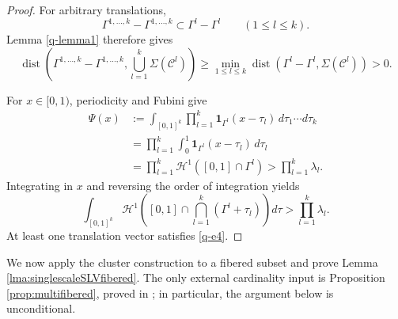 \documentclass[12pt]{amsart}
\numberwithin{equation}{section}
\begin{document}
\begin{proof}
For arbitrary translations,
\[
 \Gamma^{1,\dots,k}-\Gamma^{1,\dots,k}
 \subset\Gamma^l-\Gamma^l
 \qquad(1\leq l\leq k).
\]
Lemma \ref{q-lemma1} therefore gives
\[
 \operatorname{dist}\left(
 \Gamma^{1,\dots,k}-\Gamma^{1,\dots,k},
 \bigcup_{l=1}^k\Sigma(\mathcal C^l)\right)
 \geq\min_{1\leq l\leq k}
 \operatorname{dist}(\Gamma^l-\Gamma^l,\Sigma(\mathcal C^l))>0.
\]

For $x\in[0,1)$, periodicity and Fubini give
\begin{align*}
 \Psi(x)
 &:=\int_{[0,1]^k}\prod_{l=1}^k
 \mathbf1_{\Gamma^l}(x-\tau_l)\,d\tau_1\cdots d\tau_k\\
 &=\prod_{l=1}^k\int_0^1
 \mathbf1_{\Gamma^l}(x-\tau_l)\,d\tau_l\\
 &=\prod_{l=1}^k\mathcal H^1([0,1]\cap\Gamma^l)
 >\prod_{l=1}^k\lambda_l.
\end{align*}
Integrating in $x$ and reversing the order of integration yields
\[
 \int_{[0,1]^k}
 \mathcal H^1\left([0,1]\cap\bigcap_{l=1}^k
 (\Gamma^l+\tau_l)\right)d\tau
 >\prod_{l=1}^k\lambda_l.
\]
At least one translation vector satisfies \eqref{q-e4}.
\end{proof}



We now apply the cluster construction to a fibered subset and prove Lemma \ref{lma:singlescaleSLVfibered}.  The only external cardinality input is Proposition \ref{prop:multifibered}, proved in \cite{KLMS}; in particular, the argument below is unconditional.

\medskip
\end{document}
